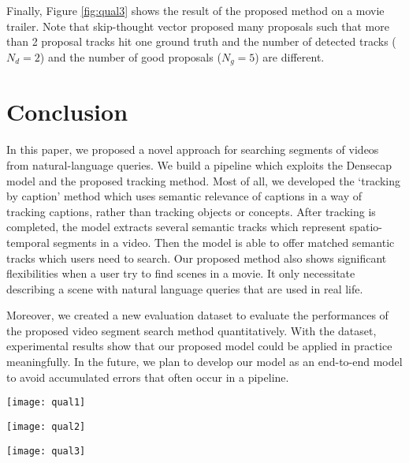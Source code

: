 Finally, Figure \textcolor{red}{\ref{fig:qual3}} shows the result of the proposed method on a movie trailer. Note that skip-thought vector proposed many proposals such that more than 2 proposal tracks hit one ground truth and the number of detected tracks ($N_d = 2$) and the number of good proposals ($N_g = 5$) are different. 




\section{Conclusion}

In this paper, we proposed a novel approach for searching segments of videos from natural-language queries.  We build a pipeline which exploits the Densecap model and the proposed tracking method. Most of all, we developed the `tracking by caption' method which uses semantic relevance of captions in a way of tracking captions, rather than tracking objects or concepts. After tracking is completed, the model extracts several semantic tracks which represent spatio-temporal segments in a video. Then the model is able to offer matched semantic tracks which users need to search. Our proposed method also shows significant flexibilities when a user try to find scenes in a movie. It only necessitate describing a scene with natural language queries that are used in real life. 

Moreover, we created a new evaluation dataset to evaluate the performances of the proposed video segment search method quantitatively. With the dataset, experimental results show that our proposed model could be applied in practice meaningfully. In the future, we plan to develop our model as an end-to-end model to avoid accumulated errors that often occur in a pipeline. 



\begin{figure*}[tbp]
\texttt{[image: qual1]}
\caption{Retrieval of video segments about different states and behaviors of the same object. (a)`the bird is flying', (b)`a bird on the branches', and (c)`a man riding a horse', (d)`a man in the water'. }
\label{fig:qual1}
\end{figure*}
%

%
\begin{figure*}[tbp]
\texttt{[image: qual2]}
\caption{Retrieval of video segments and localization. Here, we show 5 consecutive frames with bounding box that corresponds to each query. (a) The detection box is located in the `the cloudy blue sky' at the upper right of the image. (b) the detection box is located on `the elephant on the grass' in the center of the image}
\label{fig:qual2}
\end{figure*}
%

\begin{figure*}[tbp]
\texttt{[image: qual3]}
\caption{Performance of the proposed method on a real movie trailer.}
\label{fig:qual3}
\end{figure*}
%